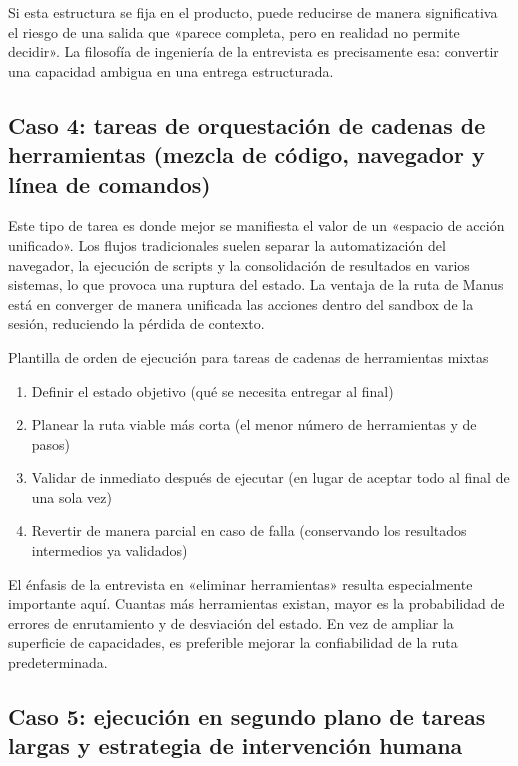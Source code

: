 Si esta estructura se fija en el producto, puede reducirse de manera significativa el riesgo de una salida que «parece completa, pero en realidad no permite decidir». La filosofía de ingeniería de la entrevista es precisamente esa: convertir una capacidad ambigua en una entrega estructurada.

\subsection{Caso 4: tareas de orquestación de cadenas de herramientas (mezcla de código, navegador y línea de comandos)}

Este tipo de tarea es donde mejor se manifiesta el valor de un «espacio de acción unificado». Los flujos tradicionales suelen separar la automatización del navegador, la ejecución de scripts y la consolidación de resultados en varios sistemas, lo que provoca una ruptura del estado. La ventaja de la ruta de Manus está en converger de manera unificada las acciones dentro del sandbox de la sesión, reduciendo la pérdida de contexto.

\begin{importantbox}{Plantilla de orden de ejecución para tareas de cadenas de herramientas mixtas}
\begin{enumerate}
    \item Definir el estado objetivo (qué se necesita entregar al final)
    \item Planear la ruta viable más corta (el menor número de herramientas y de pasos)
    \item Validar de inmediato después de ejecutar (en lugar de aceptar todo al final de una sola vez)
    \item Revertir de manera parcial en caso de falla (conservando los resultados intermedios ya validados)
\end{enumerate}
\end{importantbox}

El énfasis de la entrevista en «eliminar herramientas» resulta especialmente importante aquí. Cuantas más herramientas existan, mayor es la probabilidad de errores de enrutamiento y de desviación del estado. En vez de ampliar la superficie de capacidades, es preferible mejorar la confiabilidad de la ruta predeterminada.

\subsection{Caso 5: ejecución en segundo plano de tareas largas y estrategia de intervención humana}

